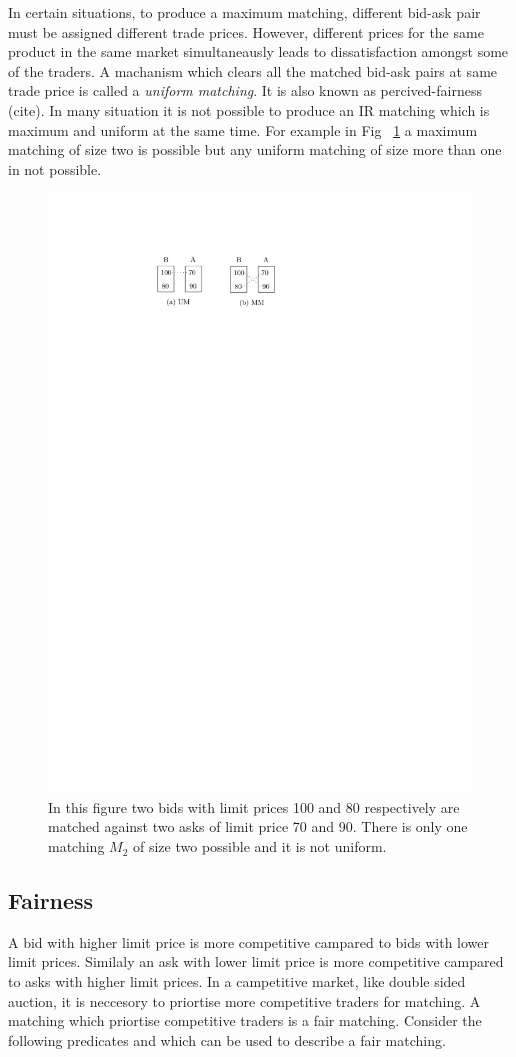 \documentclass[a4paper,UKenglish,cleveref, autoref]{lipics-v2019}
\begin{document}
In certain situations, to produce a maximum matching, different bid-ask pair must be assigned different trade prices. However, different prices for the same product in the same market simultaneausly leads to dissatisfaction amongst some of the traders. A machanism which clears all the matched bid-ask pairs at same trade price is called a \emph{uniform matching}. It is also known as percived-fairness (cite). In many situation it is not possible to produce an IR matching which is maximum and uniform at the same time. For example in Fig ~\ref{fig:mmum} a maximum matching of size two is possible but any uniform matching of size more than one in not possible. 

\begin{figure}[h!]
\centering
\includegraphics[width=.5\textwidth]{mm_um.pdf}
\caption{In this figure two bids with limit prices 100 and 80 respectively are matched against two asks of limit price 70 and 90. There is only one matching $M_2$ of size two possible and it is not uniform.}
\label{fig:mmum}
\end{figure}

\subsection{Fairness}  

A bid with higher limit price is more competitive campared to bids with lower limit prices. Similaly an ask with lower limit price is more competitive campared to asks with higher limit prices. In a campetitive market, like double sided auction, it is neccesory to priortise more competitive traders for matching. A matching which priortise competitive traders is a fair matching. Consider the following predicates  and   which can be used to describe a fair matching. 
\end{document}
